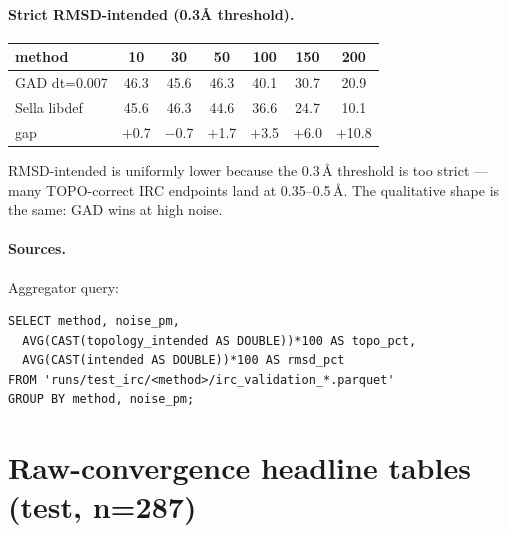 \documentclass[11pt]{article}
\begin{document}
\paragraph{Strict RMSD-intended (0.3Å threshold).}
\begin{center}\small
\begin{tabular}{l|cccccc}
\toprule
method & 10 & 30 & 50 & 100 & 150 & 200 \\
\midrule
GAD dt=0.007 & 46.3 & 45.6 & 46.3 & 40.1 & 30.7 & 20.9 \\
Sella libdef & 45.6 & 46.3 & 44.6 & 36.6 & 24.7 & 10.1 \\
gap & $+$0.7 & $-$0.7 & $+$1.7 & $+$3.5 & $+$6.0 & $+$10.8 \\
\bottomrule
\end{tabular}
\end{center}
{\small RMSD-intended is uniformly lower because the 0.3\,\AA{} threshold
is too strict — many TOPO-correct IRC endpoints land at 0.35--0.5\,\AA{}.
The qualitative shape is the same: GAD wins at high noise.}

\paragraph{Sources.} Aggregator query:
\begin{verbatim}
SELECT method, noise_pm,
  AVG(CAST(topology_intended AS DOUBLE))*100 AS topo_pct,
  AVG(CAST(intended AS DOUBLE))*100 AS rmsd_pct
FROM 'runs/test_irc/<method>/irc_validation_*.parquet'
GROUP BY method, noise_pm;
\end{verbatim}

\section{Raw-convergence headline tables (test, n=287)}
\end{document}
